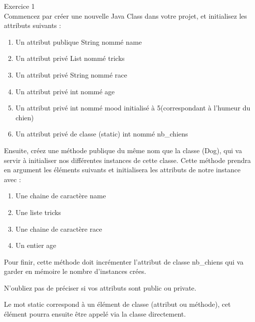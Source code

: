 \begin{Exercice} Exercice 1\\
    Commencez par créer une nouvelle Java Class dans votre projet, et initialisez les attributs suivants :
    \begin{enumerate}
    \item Un attribut publique String nommé name
    \item Un attribut privé List nommé tricks
    \item Un attribut privé String nommé race
    \item Un attribut privé int nommé age
    \item Un attribut privé int nommé mood initialisé à 5(correspondant à l'humeur du chien)
    \item Un attribut privé de classe (static) int nommé nb\_chiens
   	\end{enumerate}
   	
   	Ensuite, créez une méthode publique du même nom que la classe (Dog), qui va servir à initialiser nos différentes instances de cette classe. Cette méthode prendra en argument les éléments suivants et initialisera les attributs de notre instance avec :
   	\begin{enumerate}
    \item Une chaine de caractère name
    \item Une liste tricks
    \item Une chaine de caractère race
    \item Un entier age
   	\end{enumerate}
   	
   	Pour finir, cette méthode doit incrémenter l'attribut de classe nb\_chiens qui va garder en mémoire le nombre d'instances crées.
   	
\begin{conseil}
   N'oubliez pas de préciser si vos attributs sont public ou private.
   
   Le mot static correspond à un élément de classe (attribut ou méthode), cet élément pourra ensuite être appelé via la classe directement.
\end{conseil}
    
\begin{solution}
	
\end{solution}
\end{Exercice}

